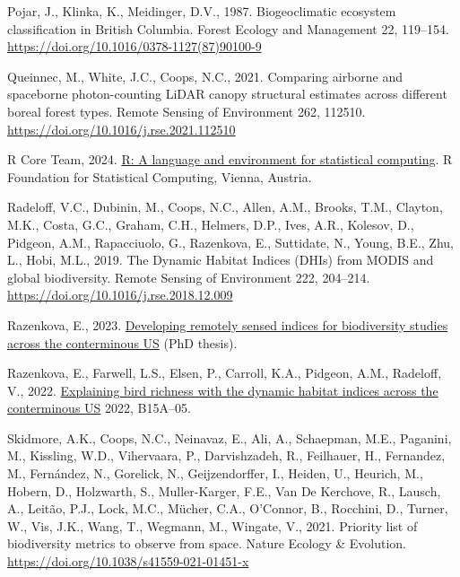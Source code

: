 \documentclass[
]{agujournal2019}
\newlength{\cslhangindent}
\newenvironment{CSLReferences}[2] %
 {\begin{list}{}{%
  \setlength{\itemindent}{0pt}
  \setlength{\leftmargin}{0pt}
  \setlength{\parsep}{0pt}
  \ifodd #1
   \setlength{\leftmargin}{\cslhangindent}
   \setlength{\itemindent}{-1\cslhangindent}
  \fi
  \setlength{\itemsep}{#2\baselineskip}}}
 {\end{list}}
\begin{document}
\begin{CSLReferences}{1}{0}
Pojar, J., Klinka, K., Meidinger, D.V., 1987. Biogeoclimatic ecosystem
classification in British Columbia. Forest Ecology and Management 22,
119--154. \url{https://doi.org/10.1016/0378-1127(87)90100-9}

Queinnec, M., White, J.C., Coops, N.C., 2021. Comparing airborne and
spaceborne photon-counting LiDAR canopy structural estimates across
different boreal forest types. Remote Sensing of Environment 262,
112510. \url{https://doi.org/10.1016/j.rse.2021.112510}

R Core Team, 2024. \href{https://www.R-project.org/}{R: A language and
environment for statistical computing}. R Foundation for Statistical
Computing, Vienna, Austria.

Radeloff, V.C., Dubinin, M., Coops, N.C., Allen, A.M., Brooks, T.M.,
Clayton, M.K., Costa, G.C., Graham, C.H., Helmers, D.P., Ives, A.R.,
Kolesov, D., Pidgeon, A.M., Rapacciuolo, G., Razenkova, E., Suttidate,
N., Young, B.E., Zhu, L., Hobi, M.L., 2019. The Dynamic Habitat Indices
(DHIs) from MODIS and global biodiversity. Remote Sensing of Environment
222, 204--214. \url{https://doi.org/10.1016/j.rse.2018.12.009}

Razenkova, E., 2023.
\href{https://digital.library.wisc.edu/1711.dl/AHEVJRQOIXB3K83}{‎Developing
remotely sensed indices for biodiversity studies across the conterminous
US} (PhD thesis).

Razenkova, E., Farwell, L.S., Elsen, P., Carroll, K.A., Pidgeon, A.M.,
Radeloff, V., 2022.
\href{https://ui.adsabs.harvard.edu/abs/2022AGUFM.B15A..05R}{Explaining
bird richness with the dynamic habitat indices across the conterminous
US} 2022, B15A--05.

Skidmore, A.K., Coops, N.C., Neinavaz, E., Ali, A., Schaepman, M.E.,
Paganini, M., Kissling, W.D., Vihervaara, P., Darvishzadeh, R.,
Feilhauer, H., Fernandez, M., Fernández, N., Gorelick, N.,
Geijzendorffer, I., Heiden, U., Heurich, M., Hobern, D., Holzwarth, S.,
Muller-Karger, F.E., Van De Kerchove, R., Lausch, A., Leitão, P.J.,
Lock, M.C., Mücher, C.A., O'Connor, B., Rocchini, D., Turner, W., Vis,
J.K., Wang, T., Wegmann, M., Wingate, V., 2021. Priority list of
biodiversity metrics to observe from space. Nature Ecology \& Evolution.
\url{https://doi.org/10.1038/s41559-021-01451-x}


\end{CSLReferences}
\end{document}
